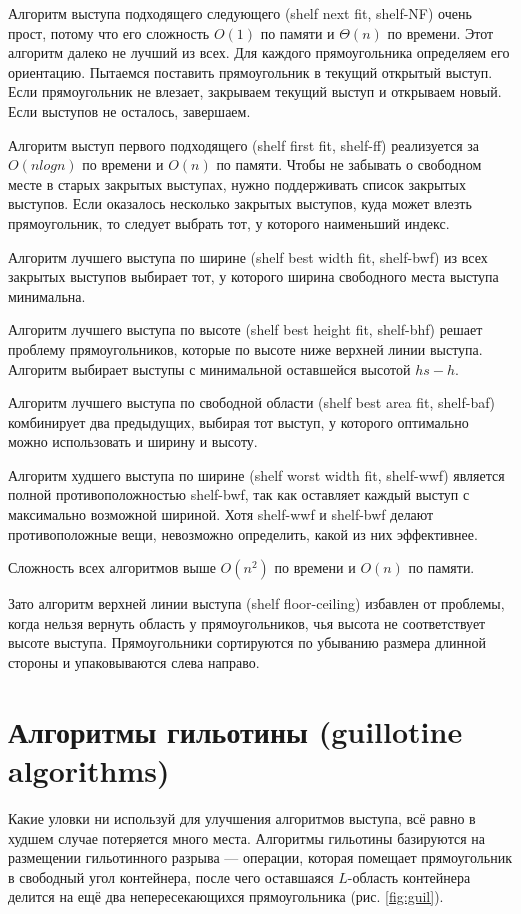 \documentclass[a4paper,12pt]{report}
\theoremstyle{remark}
\begin{document}
Алгоритм выступа подходящего следующего (shelf next fit, shelf-NF) очень прост, потому что его сложность $O(1)$ по памяти и $\Theta(n)$ по времени. Этот алгоритм далеко не лучший из всех. Для каждого прямоугольника определяем его ориентацию. Пытаемся поставить прямоугольник в текущий открытый выступ. Если прямоугольник не влезает, закрываем текущий выступ и открываем новый. Если выступов не осталось, завершаем.

Алгоритм выступ первого подходящего (shelf first fit, shelf-ff) реализуется за $O(nlogn)$ по времени и $O(n)$ по памяти. Чтобы не забывать о свободном месте в старых закрытых выступах, нужно поддерживать список закрытых выступов. Если оказалось несколько закрытых выступов, куда может влезть прямоугольник, то следует выбрать тот, у которого наименьший индекс.

Алгоритм лучшего выступа по ширине (shelf best width fit, shelf-bwf) из всех закрытых выступов выбирает тот, у которого ширина свободного места выступа минимальна.

Алгоритм лучшего выступа по высоте (shelf best height fit, shelf-bhf) решает проблему прямоугольников, которые по высоте ниже верхней линии выступа. Алгоритм выбирает выступы с минимальной оставшейся высотой $hs - h$.

Алгоритм лучшего выступа по свободной области (shelf best area fit, shelf-baf) комбинирует два предыдущих, выбирая тот выступ, у которого оптимально можно использовать и ширину и высоту.

Алгоритм худшего выступа по ширине (shelf worst width fit, shelf-wwf) является полной противоположностью shelf-bwf, так как оставляет каждый выступ с максимально возможной шириной. Хотя shelf-wwf и shelf-bwf делают противоположные вещи, невозможно определить, какой из них эффективнее.

Сложность всех алгоритмов выше $O(n^2)$ по времени и $O(n)$ по памяти.

Зато алгоритм верхней линии выступа (shelf floor-ceiling) избавлен от проблемы, когда нельзя вернуть область у прямоугольников, чья высота не соответствует высоте выступа. Прямоугольники сортируются по убыванию размера длинной стороны и упаковываются слева направо.

\section{Алгоритмы гильотины (guillotine algorithms)}

Какие уловки ни используй для улучшения алгоритмов выступа, всё равно в худшем случае потеряется много места. Алгоритмы гильотины\citep{Jylanki} базируются на размещении гильотинного разрыва — операции, которая помещает прямоугольник в свободный угол контейнера, после чего оставшаяся $L$-область контейнера делится на ещё два непересекающихся прямоугольника (рис. \ref{fig:guil}).
\end{document}
